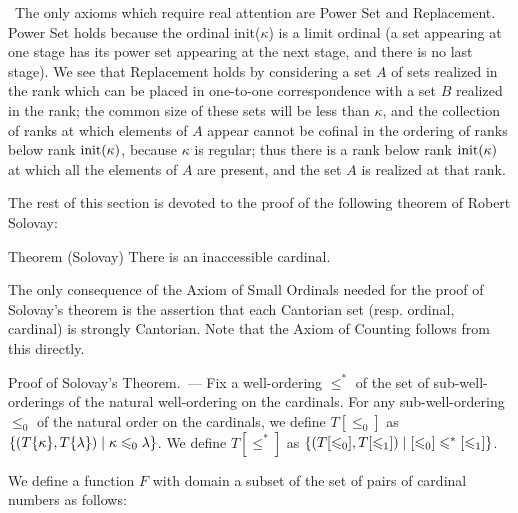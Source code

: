\preuve\ The only axioms which require real
attention are Power Set and
Replacement.  Power Set holds because the 
ordinal init($\kappa$) is a limit ordinal (a set appearing at one
stage has its power set appearing at the next stage, and there is no
last stage).  We see that Replacement holds by considering a set $A$
of sets realized in the rank which can be placed in one-to-one
correspondence with a set $B$ realized in the rank; the common size of
these sets will be less than $\kappa$, and the collection of ranks at
which elements of $A$ appear cannot be cofinal in the ordering of
ranks below rank $\mathop{\mathrm{init}}(\kappa)$, because $\kappa$ is regular; thus
there is a rank below rank $\mathop{\mathrm{init}}(\kappa)$ at which all the elements of
$A$ are present, and the set $A$ is realized at that rank.
\finpreuve

The rest of this section is devoted to the proof of the following
theorem of Robert Solovay:


\begin{Thm}{Theorem (Solovay)}
 There is an inaccessible cardinal.
\end{Thm}

The only consequence of the Axiom of Small Ordinals needed for the proof of Solovay's theorem is the
assertion that each Cantorian set (resp. ordinal,
cardinal) is strongly Cantorian.  Note that the Axiom of Counting follows from this directly.

{\sc Proof of Solovay's Theorem.~---}
Fix a well-ordering $\leq^*$ of the set of sub-well-orderings
of the natural well-ordering on the cardinals.  For any
sub-well-ordering $\leq_0$ of the natural order on the cardinals, we
define $T[\leq_0]$ as $\{(T\{\kappa\},T\{\lambda\})\mid \kappa
\leqslant_0 \lambda\}$.  We define $T[\leq^*]$ as
$\{(T[\leqslant_0],T[\leqslant_1])\mid [\leqslant_0] \leqslant^* [\leqslant_1]\}$.

We define a function $F$ with domain a subset of the set of pairs of
cardinal numbers as follows:

